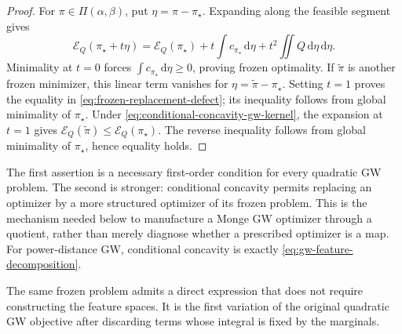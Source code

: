 \documentclass[11pt,a4paper]{article}
\theoremstyle{definition}
\theoremstyle{remark}
\newcommand{\Ecal}{\mathcal E}
\newcommand{\Piopt}{\Pi}
\newcommand{\dd}{\,\mathrm d}
\begin{document}
\begin{proof}
For \(\pi\in\Piopt(\alpha,\beta)\), put \(\eta=\pi-\pi_\star\).  Expanding
along the feasible segment gives
\begin{equation}
  \Ecal_Q(\pi_\star+t\eta)
  =\Ecal_Q(\pi_\star)
   +t\int c_{\pi_\star}\dd\eta
   +t^2\iint Q\dd\eta\dd\eta.
  \label{eq:quadratic-gw-segment-expansion}
\end{equation}
Minimality at \(t=0\) forces
\(\int c_{\pi_\star}\dd\eta\geq0\), proving frozen optimality.  If
\(\widetilde\pi\) is another frozen minimizer, this linear term vanishes for
\(\eta=\widetilde\pi-\pi_\star\).  Setting \(t=1\) proves the equality in
\eqref{eq:frozen-replacement-defect}; its inequality follows from global
minimality of \(\pi_\star\).  Under
\eqref{eq:conditional-concavity-gw-kernel}, the expansion at \(t=1\) gives
\(\Ecal_Q(\widetilde\pi)\leq\Ecal_Q(\pi_\star)\).  The reverse inequality
follows from global minimality of \(\pi_\star\), hence equality holds.
\end{proof}

The first assertion is a necessary first-order condition for every quadratic
GW problem.  The second is stronger: conditional concavity permits replacing
an optimizer by a more structured optimizer of its frozen problem.  This is
the mechanism needed below to manufacture a Monge GW optimizer through a
quotient, rather than merely diagnose whether a prescribed optimizer is a
map.  For power-distance GW, conditional concavity is exactly
\eqref{eq:gw-feature-decomposition}.

The same frozen problem admits a direct expression that does not require
constructing the feature spaces.  It is the first variation of the original
quadratic GW objective after discarding terms whose integral is fixed by the
marginals.
\end{document}
